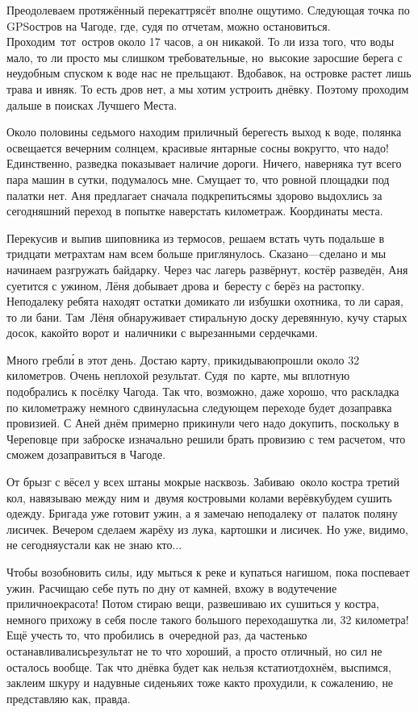 Преодолеваем протяжённый перекат\mdash трясёт вполне ощутимо. Следующая точка по GPS\mdash остров на Чагоде, где, судя по отчетам, можно остановиться. Проходим~тот~остров около 17 часов, а он никакой. То ли из\sdash за того, что воды мало, то ли просто мы слишком требовательные, но~высокие заросшие берега с неудобным спуском к воде нас не прельщают. Вдобавок, на островке растет лишь трава и ивняк. То есть дров нет, а мы хотим устроить днёвку. Поэтому проходим дальше в поисках Лучшего Места.

 Около половины седьмого находим приличный берег\mdash есть выход к воде, полянка освещается вечерним солнцем, красивые янтарные сосны вокруг\mdash то, что надо! Единственно, разведка показывает наличие дороги. Ничего, наверняка тут всего пара машин в сутки, подумалось мне. Смущает то, что ровной площадки под палатки нет. Аня предлагает сначала подкрепиться\mdash мы здорово выдохлись за сегодняшний переход в попытке наверстать километраж. Координаты места\mdash \CoordsChagodaFifteenFirstDnevka.

Перекусив и выпив шиповника из термосов, решаем встать чуть подальше в тридцати метрах\mdash там нам всем больше приглянулось. Сказано\thinspace---\thinspace сделано и мы начинаем разгружать байдарку. Через час лагерь развёрнут, костёр разведён, Аня суетится с ужином, Лёня добывает дрова и~бересту с берёз на растопку. 
\newpage 
Неподалеку ребята находят остатки домика\mdash то ли избушки охотника, то ли сарая, то ли бани. Там~Лёня обнаруживает стиральную доску деревянную, кучу старых досок, какой\sdash то ворот и~наличники с вырезанными сердечками. 

Много гребл\'{и} в этот день. Достаю карту, прикидываю\mdash прошли около 32 километров. Очень неплохой результат. Судя~по~карте, мы вплотную подобрались к посёлку Чагода. Так что, возможно, даже хорошо, что раскладка по километражу немного сдвинулась\mdash на следующем переходе будет дозаправка провизией. С Аней днём примерно прикинули чего надо докупить, поскольку в Череповце при заброске изначально решили брать провизию с тем расчетом, что сможем дозаправиться в Чагоде.

От брызг с вёсел у всех штаны мокрые насквозь. Забиваю~около костра третий кол, навязываю между ним и~двумя костровыми колами верёвку\mdash будем сушить одежду. Бригада уже готовит ужин, а я замечаю неподалеку от~палаток поляну лисичек. Вечером сделаем жарёху из лука, картошки и лисичек. Но уже, видимо, не сегодня\mdash устали как не знаю кто$\ldots$ 

Чтобы возобновить силы, иду мыться к реке и купаться нагишом, пока поспевает ужин. Расчищаю себе путь по дну от камней, вхожу в воду\mdash течение приличное\mdash красота! Потом стираю вещи, развешиваю их сушиться у костра, немного прихожу в себя после такого большого перехода\mdash шутка ли, 32 километра! Ещё учесть то, что пробились в~очередной раз, да частенько останавливались\mdash результат не то что хороший, а просто отличный, но сил не осталось вообще. Так что днёвка будет как нельзя кстати\mdash отдохнём, выспимся, заклеим шкуру и надувные сиденья\mdash их тоже как\sdash то прохудили, к сожалению, не представляю как, правда.

